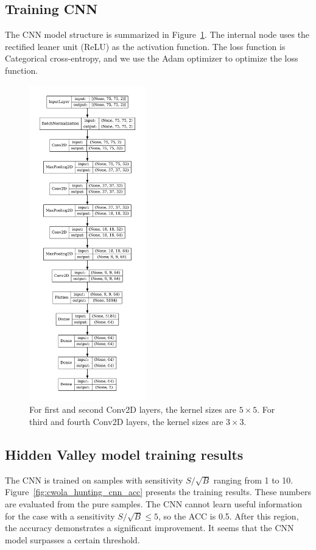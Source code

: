 \documentclass[12pt]{article}
\begin{document}
    \subsection{Training CNN}%
    \label{sub:training_cnn}
        The CNN model structure is summarized in Figure~\ref{fig:cnn_model_structure}. The internal node uses the rectified leaner unit (ReLU) as the activation function. The loss function is Categorical cross-entropy, and we use the Adam optimizer to optimize the loss function.
        \begin{figure}[htpb]
            \centering
            \includegraphics[width=0.45\textwidth]{CNN_model_structure.pdf}
            \caption{For first and second Conv2D layers, the kernel sizes are $5 \times 5$. For third and fourth Conv2D layers, the kernel sizes are $3 \times 3$.}
            \label{fig:cnn_model_structure}
        \end{figure}
    \subsection{Hidden Valley model training results}%
    \label{sub:hidden_valley_model_training_results}
        The CNN is trained on samples with sensitivity $S / \sqrt{B}$ ranging from 1 to 10. Figure~\ref{fig:cwola_hunting_cnn_acc} presents the training results. These numbers are evaluated from the pure samples. The CNN cannot learn useful information for the case with a sensitivity $S / \sqrt{B} \le  5$, so the ACC is 0.5. After this region, the accuracy demonstrates a significant improvement. It seems that the CNN model surpasses a certain threshold.
\end{document}
